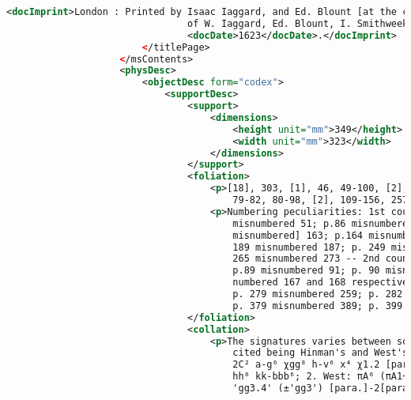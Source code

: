 \documentclass[class=article, crop=false]{standalone}
\begin{document}
\begin{lstlisting}[language=XML]
                            <docImprint>London : Printed by Isaac Iaggard, and Ed. Blount [at the charges
                                of W. Iaggard, Ed. Blount, I. Smithweeke, and W. Aspley].,
                                <docDate>1623</docDate>.</docImprint>
                        </titlePage>
                    </msContents>
                    <physDesc>
                        <objectDesc form="codex">
                            <supportDesc>
                                <support>
                                    <dimensions>
                                        <height unit="mm">349</height>
                                        <width unit="mm">323</width>
                                    </dimensions>
                                </support>
                                <foliation>
                                    <p>[18], 303, [1], 46, 49-100, [2], 69-232, [2], 79-80, [26], 76,
                                        79-82, 80-98, [2], 109-156, 257-993 [i.e. 399], [1] p.; fol.</p>
                                    <p>Numbering peculiarities: 1st count: p.50 misnumbered 58; p.59
                                        misnumbered 51; p.86 misnumbered 88; p.153 misnumbered 151; p.161
                                        misnumbered] 163; p.164 misnumbered 162; p. 165 misnumbered 163; p.
                                        189 misnumbered 187; p. 249 misnumbered 251; p.250 misnumbered 252; p.
                                        265 misnumbered 273 -- 2nd count: p.37 misnumbered 39 in some copies;
                                        p.89 misnumbered 91; p. 90 misnumbered 92 -- 3rd count: p.165-166
                                        numbered 167 and 168 respectively; p. 216 numbered 218 -- 5th count:
                                        p. 279 misnumbered 259; p. 282 misnumbered 280; p.308 misnumbered 38;
                                        p. 379 misnumbered 389; p. 399 misnumbered 993.</p>
                                </foliation>
                                <collation>
                                    <p>The signatures varies between sources, with the most commonly
                                        cited being Hinman's and West's: 1. Hinman: πA⁶ (πA1+1) [πB²], ²A-2B⁶
                                        2C² a-g⁶ χgg⁸ h-v⁶ x⁴ χ1.2 [para.]-2[para.]⁶ 3[para]¹ aa-ff⁶ gg² Gg⁶
                                        hh⁶ kk-bbb⁶; 2. West: πA⁶ (πA1+1, πA5+1.2)²A-2B⁶ 2C² a-g⁶ ²g⁸ h-v⁶ x⁴
                                        'gg3.4' (±'gg3') [para.]-2[para.]⁶ 3[para]¹ 2a-2f⁶ 2g² 2G⁶ 2h⁶ 2k-2v⁶

\end{lstlisting}
\end{document}
